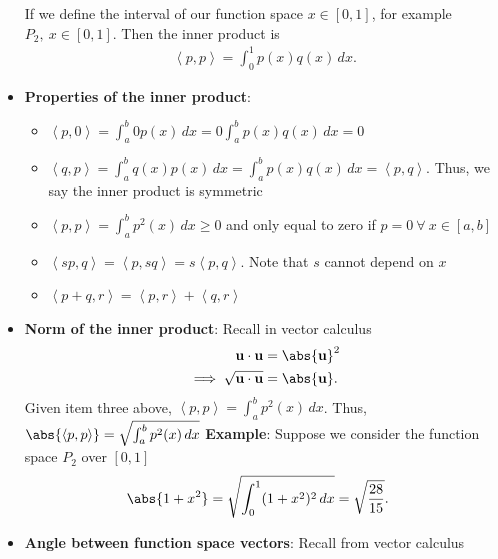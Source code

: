 \documentclass{report}
\begin{document}
\begin{itemize}
            If we define the interval of our function space $x\in [0,1]$, for example $P_{2},\ x\in [0,1]$. Then the inner product is
            \begin{align*}
                \left\langle p,p \right\rangle = \int_{0}^{1} p(x)q(x) \, dx
            .\end{align*}
        \item \textbf{Properties of the inner product}: 
            \begin{itemize}
                \item $\left\langle p,0 \right\rangle = \int_{a}^{b} 0p(x) \, dx  = 0\int_{a}^{b}  p(x)q(x)\, dx= 0$
                \item $\left\langle q,p \right\rangle = \int_{a}^{b} q(x)p(x) \, dx = \int_{a}^{b} p(x)q(x) \, dx = \left\langle p,q \right\rangle$. Thus, we say the inner product is symmetric
                \item $\left\langle p,p \right\rangle = \int_{a}^{b} p^{2}(x) \, dx \geq 0 $ and only equal to zero if $p=0 \ \forall \ x\in [a,b]$
                \item $\left\langle sp,q \right\rangle = \left\langle p,sq \right\rangle = s\left\langle p,q \right\rangle$. Note that $s$ cannot depend on $x$
                \item $\left\langle p + q, r  \right\rangle  = \left\langle p,r \right\rangle  + \left\langle q,r \right\rangle$
            \end{itemize}
        \item \textbf{Norm of the inner product}: Recall in vector calculus
            \begin{align*}
                \mathbf{u} \cdot \mathbf{u} &= \abs{\mathbf{u}}^{2} \\
                \implies \sqrt{\mathbf{u}\cdot \mathbf{u}} &= \abs{\mathbf{u}}
            .\end{align*}
            Given item three above, $\left\langle p,p \right\rangle = \int_{a}^{b} p^{2}(x) \, dx$. Thus, $\abs{\left\langle p,p \right\rangle}  = \sqrt{\int_{a}^{b} p^{2}(x) \, dx}$
            \bigbreak \noindent 
            \textbf{Example}: Suppose we consider the function space $P_{2}$ over $[0,1] $
            \begin{align*}
                \abs{1+x^{2}} &= \sqrt{\int_{0}^{1} (1+x^{2})^{2} \, dx}=\sqrt{\frac{28}{15}}
            .\end{align*}
        \item \textbf{Angle between function space vectors}: Recall from vector calculus 

\end{itemize}
\end{document}
